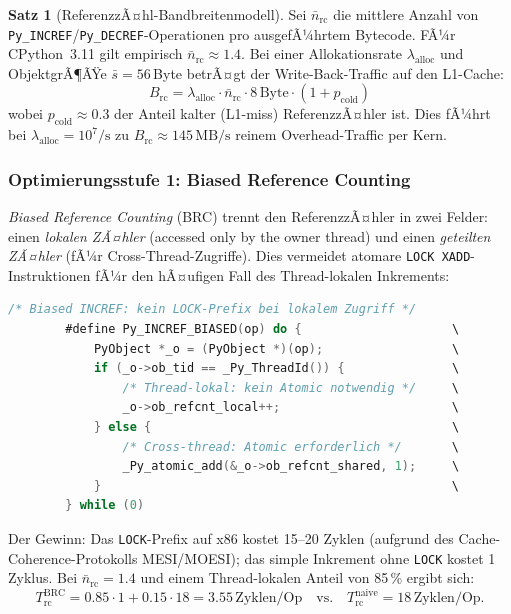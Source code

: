 ﻿\documentclass[a4paper,12pt]{scrreprt}
\theoremstyle{definition}
\newtheorem{satz}{Satz}[section]
\begin{document}
	\begin{satz}[ReferenzzÃ¤hl-Bandbreitenmodell]
		\label{satz:refcount_bw}
		Sei $\bar{n}_{\mathrm{rc}}$ die mittlere Anzahl von
		\texttt{Py\_INCREF}/\newline \texttt{Py\_DECREF}-Operationen pro
		ausgefÃ¼hrtem Bytecode. FÃ¼r CPython~3.11 gilt empirisch
		$\bar{n}_{\mathrm{rc}} \approx 1.4$. Bei einer Allokationsrate
		$\lambda_{\mathrm{alloc}}$ und ObjektgrÃ¶ÃŸe $\bar{s} = 56$\,Byte
		betrÃ¤gt der Write-Back-Traffic auf den L1-Cache:
		\[
		B_{\mathrm{rc}} = \lambda_{\mathrm{alloc}} \cdot \bar{n}_{\mathrm{rc}}
		\cdot 8\,\mathrm{Byte} \cdot (1 + p_{\mathrm{cold}})
		\]
		wobei $p_{\mathrm{cold}} \approx 0.3$ der Anteil kalter (L1-miss)
		ReferenzzÃ¤hler ist. Dies fÃ¼hrt bei $\lambda_{\mathrm{alloc}} = 10^7/\mathrm{s}$
		zu $B_{\mathrm{rc}} \approx 145\,\mathrm{MB/s}$ reinem Overhead-Traffic
		per Kern.
	\end{satz}
	
	\subsubsection{Optimierungsstufe 1: Biased Reference Counting}
	
	\emph{Biased Reference Counting} (BRC) \cite{shanBiased} trennt
	den ReferenzzÃ¤hler in zwei Felder: einen \emph{lokalen ZÃ¤hler}
	(accessed only by the owner thread) und einen \emph{geteilten ZÃ¤hler}
	(fÃ¼r Cross-Thread-Zugriffe). Dies vermeidet atomare
	\texttt{LOCK XADD}-Instruktionen fÃ¼r den hÃ¤ufigen Fall des
	Thread-lokalen Inkrements:
	
	\begin{lstlisting}[language=C, caption={Biased Reference Counting: lokales INCREF},
		label=lst:brc]
		/* Biased INCREF: kein LOCK-Prefix bei lokalem Zugriff */
		#define Py_INCREF_BIASED(op) do {                     \
			PyObject *_o = (PyObject *)(op);                  \
			if (_o->ob_tid == _Py_ThreadId()) {               \
				/* Thread-lokal: kein Atomic notwendig */     \
				_o->ob_refcnt_local++;                        \
			} else {                                          \
				/* Cross-thread: Atomic erforderlich */       \
				_Py_atomic_add(&_o->ob_refcnt_shared, 1);     \
			}                                                 \
		} while (0)
	\end{lstlisting}
	
	Der Gewinn: Das \texttt{LOCK}-Prefix auf x86 kostet 15--20 Zyklen
	(aufgrund des Cache-Coherence-Protokolls MESI/MOESI); das simple
	Inkrement ohne \texttt{LOCK} kostet 1 Zyklus. Bei
	$\bar{n}_{\mathrm{rc}} = 1.4$ und einem Thread-lokalen Anteil von
	85\,\% ergibt sich:
	\[
	T_{\mathrm{rc}}^{\mathrm{BRC}} = 0.85 \cdot 1 + 0.15 \cdot 18 = 3.55\,\text{Zyklen/Op}
	\quad \text{vs.} \quad T_{\mathrm{rc}}^{\mathrm{naive}} = 18\,\text{Zyklen/Op}.
	\]
	
\end{document}
